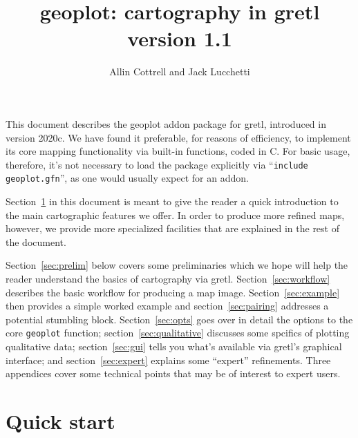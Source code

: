 \documentclass{article}
\title{geoplot: cartography in gretl\\ version 1.1}
\author{Allin Cottrell and Jack Lucchetti}
\begin{document}
\maketitle

This document describes the \textsf{geoplot} addon package for gretl,
introduced in version 2020c. We have found it preferable, for reasons
of efficiency, to implement its core mapping functionality via
built-in functions, coded in C. For basic usage, therefore, it's not
necessary to load the package explicitly via ``\texttt{include
  geoplot.gfn}'', as one would usually expect for an addon.

Section~\ref{sec:quick} in this document is meant to give the reader a
quick introduction to the main cartographic features we offer. In
order to produce more refined maps, however, we provide more
specialized facilities that are explained in the rest of the document.

Section~\ref{sec:prelim} below covers some preliminaries which we hope
will help the reader understand the basics of cartography via
gretl. Section~\ref{sec:workflow} describes the basic workflow for
producing a map image. Section~\ref{sec:example} then provides a
simple worked example and section~\ref{sec:pairing} addresses a
potential stumbling block. Section~\ref{sec:opts} goes over in detail
the options to the core \texttt{geoplot} function;
section~\ref{sec:qualitative} discusses some spcifics of plotting
qualitative data; section~\ref{sec:gui} tells you what's available via
gretl's graphical interface; and section~\ref{sec:expert} explains
some ``expert'' refinements. Three appendices cover some technical
points that may be of interest to expert users.

\section{Quick start}
\label{sec:quick}
\end{document}
